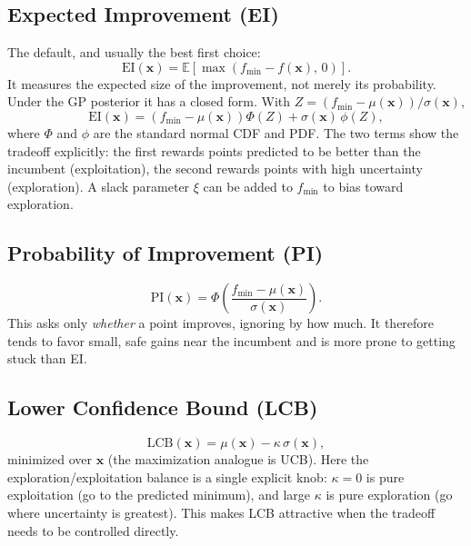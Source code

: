 \documentclass[conference]{IEEEtran}
\begin{document}
\subsection*{Expected Improvement (EI)}
The default, and usually the best first choice:
\begin{equation}
    \mathrm{EI}(\mathbf{x}) = \mathbb{E}\!\left[\max\!\left(f_{\min} - f(\mathbf{x}),\, 0\right)\right].
\end{equation}
It measures the expected size of the improvement, not merely its probability. Under the GP posterior it has a closed form. With $Z = (f_{\min} - \mu(\mathbf{x}))/\sigma(\mathbf{x})$,
\begin{equation}
    \mathrm{EI}(\mathbf{x}) = \left(f_{\min} - \mu(\mathbf{x})\right)\Phi(Z) + \sigma(\mathbf{x})\,\phi(Z),
\end{equation}
where $\Phi$ and $\phi$ are the standard normal CDF and PDF. The two terms show the tradeoff explicitly: the first rewards points predicted to be better than the incumbent (exploitation), the second rewards points with high uncertainty (exploration). A slack parameter $\xi$ can be added to $f_{\min}$ to bias toward exploration.

\subsection*{Probability of Improvement (PI)}
\begin{equation}
    \mathrm{PI}(\mathbf{x}) = \Phi\!\left(\frac{f_{\min} - \mu(\mathbf{x})}{\sigma(\mathbf{x})}\right).
\end{equation}
This asks only \textit{whether} a point improves, ignoring by how much. It therefore tends to favor small, safe gains near the incumbent and is more prone to getting stuck than EI.

\subsection*{Lower Confidence Bound (LCB)}
\begin{equation}
    \mathrm{LCB}(\mathbf{x}) = \mu(\mathbf{x}) - \kappa\,\sigma(\mathbf{x}),
\end{equation}
minimized over $\mathbf{x}$ (the maximization analogue is UCB). Here the exploration/exploitation balance is a single explicit knob: $\kappa = 0$ is pure exploitation (go to the predicted minimum), and large $\kappa$ is pure exploration (go where uncertainty is greatest). This makes LCB attractive when the tradeoff needs to be controlled directly.
\end{document}
